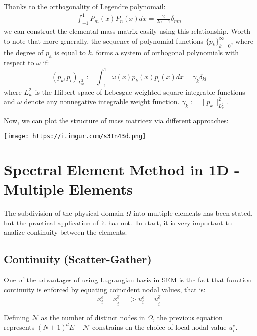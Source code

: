 \documentclass[
  a4paper,
  10pt]{article}
\begin{document}
Thanks to the orthogonality of Legendre polynomail: \begin{align}
\int_{-1}^1 P_m(x)P_n(x) dx = \frac{2}{2n+1}\delta_{mn} 
\end{align} we can construct the elemental mass matrix easily using this
relationship. Worth to note that more generally, the sequence of
polynomial functions \({\{p_k\}}^{\infty}_{k=0}\), where the degree of
\(p_k\) is equal to \(k\), forms a system of orthogonal polynomials with
respect to \(\omega\) if: \begin{equation}
(p_k,p_l)_{L_w^2}:=\int_{-1}^1\omega(x)p_k(x)p_l(x)dx= \gamma_k\delta_{kl}
\end{equation} where \(L_w^2\) is the Hilbert space of
Lebesgue-weighted-square-integrable functions and \(\omega\) denote any
nonnegative integrable weight function. \(\gamma_k:=\|p_k\|^2_{L_w^2}\).

Now, we can plot the structure of mass matricex via different
approaches:

\texttt{[image: https://i.imgur.com/s3In43d.png]}

\hypertarget{spectral-element-method-in-1d---multiple-elements}{%
\section{Spectral Element Method in 1D - Multiple
Elements}\label{spectral-element-method-in-1d---multiple-elements}}

The subdivision of the physical domain \(\Omega\) into multiple elements
has been stated, but the practical application of it has not. To start,
it is very important to analize continuity between the elements.

\hypertarget{continuity-scatter-gather}{%
\subsection{Continuity
(Scatter-Gather)}\label{continuity-scatter-gather}}

One of the advantages of using Lagrangian basis in SEM is the fact that
function continuity is enforced by equating coincident nodal values,
that is: \begin{equation}
    x_{i}^{e}=x_{\hat{i}}^{\hat{e}} => u_{i}^{e}=u_{\hat{i}}^{\hat{e}}
\end{equation}

Defining \(\mathcal{N}\) as the number of distinct nodes in \(\Omega\),
the previous equation represents \((N+1)^{d}E-\mathcal{N}\) constrains
on the choice of local nodal value \(u_{i}^{e}\).
\end{document}
